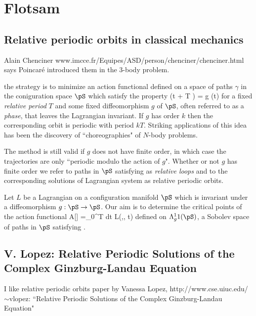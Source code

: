 %

\section{Flotsam}


\subsection{Relative periodic orbits in classical mechanics}

Alain Chenciner www.imcce.fr/Equipes/ASD/person/chenciner/chenciner.html
says Poincar\'e introduced them in the 3-body problem.


 the strategy
is to minimize an action functional defined on a space of paths $\gamma$ in the
coniguration space $\pS$ which satisfy the property
\beq
                               \gamma (t + T ) = g \cdot \gamma (t)                       
\label{McC1}
\eeq
for a fixed {\em relative period} $T$ and some fixed diffeomorphism $g$ of $\pS$, often
referred to as a {\em phase}, that leaves the Lagrangian invariant. If $g$ has order
$k$ then the corresponding orbit is periodic with period $k T$. 
Striking applications of this idea has been the discovery
of ``choreographies" of $N$-body problems.

     The method is still valid if $g$ does not have finite order, in which case the
trajectories are only ``periodic modulo the action of $g$". Whether or not $g$
has finite order we refer to paths in $\pS$ satisfying  as 
{\em relative loops} and
to the corresponding solutions of Lagrangian system as {relative periodic
orbits}. 

    Let $L$ be a Lagrangian on a configuration manifold $\pS$ which is invariant
under a diffeomorphism $g : \pS \to\pS$. Our aim is to determine
the critical points of the action functional
\beq
	A[\gamma] =\int_0^T  dt L(\gamma,\dot\gamma, t)
\label{McC2}
\eeq
defined on $\Lambda_g^11 (\pS)$, a Sobolev space of paths in $\pS$ satisfying 
.


\subsection{V. Lopez: 
	    Relative Periodic Solutions of the Complex Ginzburg-Landau Equation}

I like relative periodic orbits paper by
Vanessa Lopez,
        http://www.cse.uiuc.edu/$\sim$vlopez:
``Relative Periodic Solutions of the Complex Ginzburg-Landau Equation" 
     
